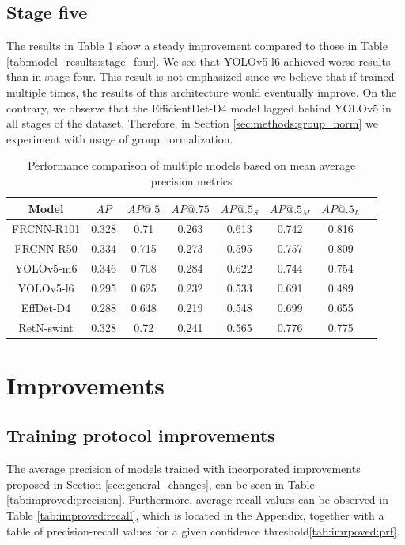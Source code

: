 \subsection{Stage five}
The results in Table \ref{tab:model_results:stage_five} show a steady improvement compared to those in Table \ref{tab:model_results:stage_four}. We see that YOLOv5-l6 achieved worse results than in stage four. This result is not emphasized since we believe that if trained multiple times, the results of this architecture would eventually improve. On the contrary, we observe that the EfficientDet-D4 model lagged behind YOLOv5 in all stages of the dataset. Therefore, in Section \ref{sec:methods:group_norm} we experiment with usage of group normalization.
\begin{table}[H]
    \begin{tabular}{|c|c|c|c|c|c|c|c|}
        \hline
        Model      & $AP$  & $AP@.5$ & $AP@.75$ & $AP@.5_S$ & $AP@.5_M$ & $AP@.5_L$ \\ \hline
        FRCNN-R101 & 0.328 & 0.71    & 0.263    & 0.613     & 0.742     & 0.816     \\ \hline
        FRCNN-R50  & 0.334 & 0.715   & 0.273    & 0.595     & 0.757     & 0.809     \\ \hline
        YOLOv5-m6  & 0.346 & 0.708   & 0.284    & 0.622     & 0.744     & 0.754     \\ \hline
        YOLOv5-l6  & 0.295 & 0.625   & 0.232    & 0.533     & 0.691     & 0.489     \\ \hline
        EffDet-D4  & 0.288 & 0.648   & 0.219    & 0.548     & 0.699     & 0.655     \\ \hline
        RetN-swint & 0.328 & 0.72    & 0.241    & 0.565     & 0.776     & 0.775     \\ \hline
    \end{tabular}
    \caption{Performance comparison of multiple models based on mean average precision metrics}
    \label{tab:model_results:stage_five}
\end{table}

\section{Improvements}
\label{sec:model_improvements_results}
\subsection{Training protocol improvements}
The average precision of models trained with incorporated improvements proposed in Section \ref{sec:general_changes}, can be seen in Table \ref{tab:improved:precision}. Furthermore, average recall values can be observed in Table \ref{tab:improved:recall}, which is located in the Appendix, together with a table of precision-recall values for a given confidence threshold\ref{tab:imrpoved:prf}.


